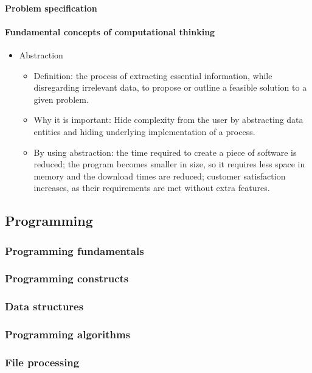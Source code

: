 \documentclass[a4paper,12pt]{article}
\begin{document}
\paragraph{Problem specification}
\paragraph{Fundamental concepts of computational thinking}
\begin{itemize}
    \item Abstraction
    \begin{itemize}
        \item Definition: the process of extracting essential information, while disregarding irrelevant data, to propose or outline a feasible solution to a given problem.
        \item Why it is important: Hide complexity from the user by abstracting data entities and hiding underlying implementation of a process.
        \item By using abstraction: the time required to create a piece of software is reduced; the program becomes smaller in size, so it requires less space in memory and the download times are reduced; customer satisfaction increases, as their requirements are met without extra features. 
    \end{itemize}
\end{itemize}

\subsection{Programming}
\subsubsection{Programming fundamentals}
\subsubsection{Programming constructs}
\subsubsection{Data structures}
\subsubsection{Programming algorithms}
\subsubsection{File processing}
\end{document}
